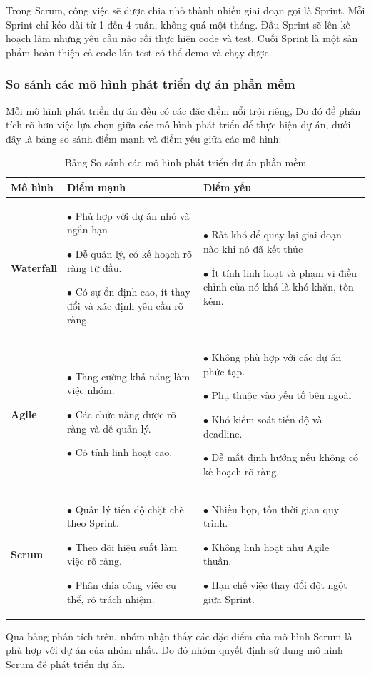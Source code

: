     Trong Scrum, công việc sẽ được chia nhỏ thành nhiều giai đoạn gọi là Sprint. Mỗi Sprint chỉ kéo dài từ 1 đến 4 tuần, không quá một tháng. Đầu Sprint sẽ lên kế hoạch làm những yêu cầu nào rồi thực hiện code và test. Cuối Sprint là một sản phẩm hoàn thiện cả code lẫn test có thể demo và chạy được.

    \subsubsection{So sánh các mô hình phát triển dự án phần mềm}
    Mỗi mô hình phát triển dự án đều có các đặc điểm nổi trội riêng, Do đó để phân tích rõ hơn việc lựa chọn giữa các mô hình phát triển để thực hiện dự án, dưới đây là bảng so sánh điểm mạnh và điểm yếu giữa các mô hình:
    \begin{table}[H]
    \centering
    \begin{tabular}{|p{2cm}|p{6cm}|p{6cm}|}
    \hline
    \textbf{Mô hình} & \textbf{Điểm mạnh} & \textbf{Điểm yếu}\\
    \hline
    \textbf{Waterfall} & 
            $\bullet$ Phù hợp với dự án nhỏ và ngắn hạn
            
            $\bullet$ Dễ quản lý, có kế hoạch rõ ràng từ đầu.
            
            $\bullet$ Có sự ổn định cao, ít thay đổi và xác định yêu cầu rõ ràng.
        & 
            $\bullet$ Rất khó để quay lại giai đoạn nào khi nó đã kết thúc
            
            $\bullet$ Ít tính linh hoạt và phạm vi điều chỉnh của nó khá là khó khăn, tốn kém.
         \\
    \hline
    \textbf{Agile} & 
            $\bullet$ Tăng cường khả năng làm việc nhóm.
            
            $\bullet$ Các chức năng được rõ ràng và dễ quản lý.
            
            $\bullet$ Có tính linh hoạt cao.
        & 
            $\bullet$ Không phù hợp với các dự án phức tạp.
            
            $\bullet$ Phụ thuộc vào yếu tố bên ngoài
            
            $\bullet$ Khó kiểm soát tiến độ và deadline.
            
            $\bullet$ Dễ mất định hướng nếu không có kế hoạch rõ ràng.
         \\
    \hline
    \textbf{Scrum} & 
            $\bullet$ Quản lý tiến độ chặt chẽ theo Sprint.
            
            $\bullet$ Theo dõi hiệu suất làm việc rõ ràng.
            
            $\bullet$ Phân chia công việc cụ thể, rõ trách nhiệm.
        & 
            $\bullet$ Nhiều họp, tốn thời gian quy trình.
            
            $\bullet$ Không linh hoạt như Agile thuần.
            
            $\bullet$ Hạn chế việc thay đổi đột ngột giữa Sprint.
         \\
    \hline
    \end{tabular}
    \caption{Bảng So sánh các mô hình phát triển dự án phần mềm}
\end{table}
    Qua bảng phân tích trên, nhóm nhận thấy các đặc điểm của mô hình Scrum là phù hợp với dự án của nhóm nhất. Do đó nhóm quyết định sử dụng mô hình Scrum để phát triển dự án.

